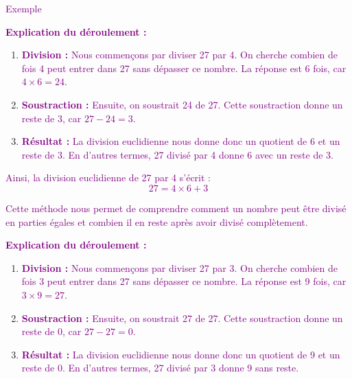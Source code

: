 \documentclass{article}
\begin{document}
\textcolor{purple}{Exemple }

\begin{tcolorbox}[colback=cyan!10!white, colframe=orange!75!black, title=\textcolor{white}{Division Euclidienne de 27 par 4 avec reste non nul}, sharp corners=southwest]
\centering
{}
\end{tcolorbox}

\textcolor{purple}{\textbf{Explication du déroulement :}}

\begin{enumerate}
    \item \textcolor{purple}{\textbf{Division :} Nous commençons par diviser 27 par 4. On cherche combien de fois 4 peut entrer dans 27 sans dépasser ce nombre. La réponse est 6 fois, car \(4 \times 6 = 24\).}
    \item \textcolor{purple}{\textbf{Soustraction :} Ensuite, on soustrait 24 de 27. Cette soustraction donne un reste de 3, car \(27 - 24 = 3\).}
    \item \textcolor{purple}{\textbf{Résultat :} La division euclidienne nous donne donc un quotient de 6 et un reste de 3. En d'autres termes, 27 divisé par 4 donne 6 avec un reste de 3.}
\end{enumerate}

\vspace{0.1cm}

\textcolor{purple}{Ainsi, la division euclidienne de 27 par 4 s'écrit : 
\[ 27 = 4 \times 6 + 3 \]}

\textcolor{purple}{Cette méthode nous permet de comprendre comment un nombre peut être divisé en parties égales et combien il en reste après avoir divisé complètement.}


\vspace{0.4cm}

\begin{tcolorbox}[colback=cyan!10!white, colframe=orange!75!black, title=\textcolor{white}{Division Euclidienne de 27 par 4 avec reste zéro}, 
                  sharp corners=southwest]
\centering
{}
\end{tcolorbox}

\vspace{0.4cm}

\textcolor{purple}{\textbf{Explication du déroulement :}}

\begin{enumerate}
    \item \textcolor{purple}{\textbf{Division :} Nous commençons par diviser 27 par 3. On cherche combien de fois 3 peut entrer dans 27 sans dépasser ce nombre. La réponse est 9 fois, car \(3 \times 9 = 27\).}
    \item \textcolor{purple}{\textbf{Soustraction :} Ensuite, on soustrait 27 de 27. Cette soustraction donne un reste de 0, car \(27 - 27 = 0\).}
    \item \textcolor{purple}{\textbf{Résultat :} La division euclidienne nous donne donc un quotient de 9 et un reste de 0. En d'autres termes, 27 divisé par 3 donne 9 sans reste.}
\end{enumerate}
\end{document}

